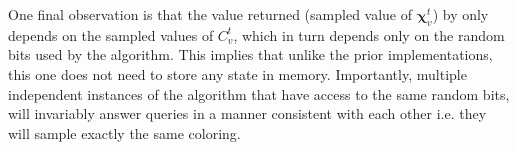 One final observation is that the value returned (sampled value of $\bm\chi^t_v$) by  only depends on the sampled values of $C^t_v$,
which in turn depends only on the random bits used by the algorithm.
This implies that unlike the prior implementations, this one does not need to store any state in memory.
Importantly, multiple independent instances of the algorithm that have access to the same random bits,
will invariably answer queries in a manner consistent with each other i.e. they will sample exactly the same coloring.
